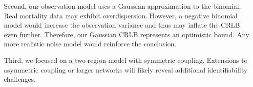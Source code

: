 Second, our observation model uses a Gaussian approximation to the
binomial. Real mortality data may exhibit overdispersion. However, a
negative binomial model would increase the observation variance and
thus may inflate the CRLB even further. Therefore, our Gaussian CRLB
represents an optimistic bound. Any more realistic noise model would
reinforce the conclusion.

Third, we focused on a two-region model with symmetric coupling.
Extensions to asymmetric coupling or larger networks will likely
reveal additional identifiability challenges.
